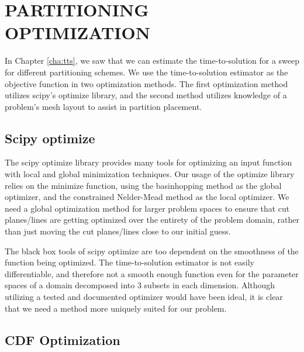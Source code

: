%
%
%
%



\chapter{PARTITIONING OPTIMIZATION \label{cha:optimization}}
In Chapter \ref{cha:tts}, we saw that we can estimate the time-to-solution for a sweep for different partitioning schemes.
We use the time-to-solution estimator as the objective function in two optimization methods.
The first optimization method utilizes scipy's optimize library, and the second method utilizes knowledge of a problem's mesh layout to assist in partition placement.
\section{Scipy optimize}
The scipy optimize library \cite{scipy} provides many tools for optimizing an input function with local and global minimization techniques.
Our usage of the optimize library relies on the minimize function, using the basinhopping \cite{basinhoppingwales} method as the global optimizer, and the constrained Nelder-Mead method as the local optimizer.
We need a global optimization method for larger problem spaces to ensure that cut planes/lines are getting optimized over the entirety of the problem domain, rather than just moving the cut planes/lines close to our initial guess.

The black box tools of scipy optimize are too dependent on the smoothness of the function being optimized.
The time-to-solution estimator is not easily differentiable, and therefore not a smooth enough function even for the parameter spaces of a domain decomposed into 3 subsets in each dimension.
Although utilizing a tested and documented optimizer would have been ideal, it is clear that we need a method more uniquely suited for our problem.

\section{CDF Optimization}

